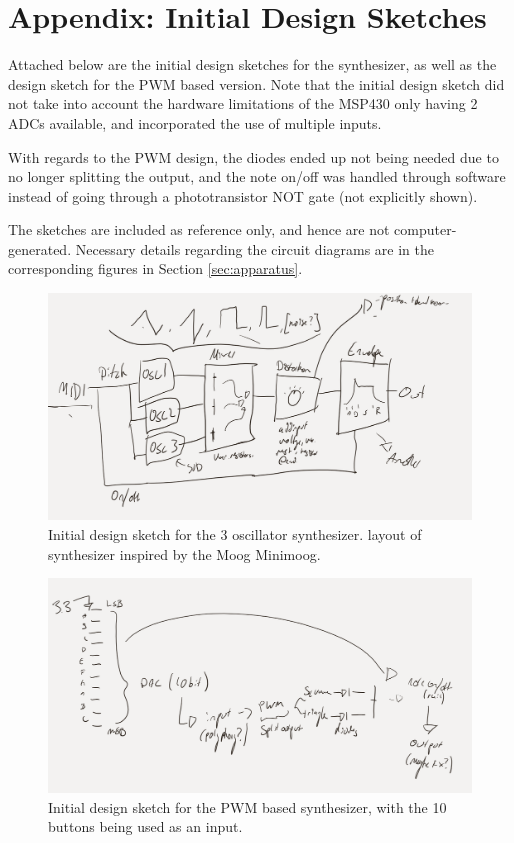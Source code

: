 \documentclass[12pt]{article}
\begin{document}
\section{Appendix: Initial Design Sketches}

Attached below are the initial design sketches for the synthesizer, as well as the design sketch for the PWM based version. Note that the initial design sketch did not take into account the hardware limitations of the MSP430 only having 2 ADCs available, and incorporated the use of multiple inputs. 

With regards to the PWM design, the diodes ended up not being needed due to no longer splitting the output, and the note on/off was handled through software instead of going through a phototransistor NOT gate (not explicitly shown). 

The sketches are included as reference only, and hence are not computer-generated. Necessary details regarding the circuit diagrams are in the corresponding figures in Section \ref{sec:apparatus}. 

\begin{figure}[h]
    \centering
    \includegraphics[width = 0.9 \textwidth]{initialsketch.png}
    \caption{Initial design sketch for the 3 oscillator synthesizer. layout of synthesizer inspired by the Moog Minimoog.}
    \label{fig:my_label}
\end{figure}

\begin{figure}[h]
    \centering
    \includegraphics[width = 0.9 \textwidth]{pwmsynthsketch.png}
    \caption{Initial design sketch for the PWM based synthesizer, with the 10 buttons being used as an input.}
    \label{fig:my_label}
\end{figure}
\end{document}
